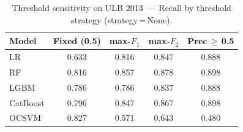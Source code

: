 \begin{table}[ht]
\centering
\caption{Threshold sensitivity on ULB 2013~--- Recall by threshold strategy (strategy\,=\,None).}
\label{tab:threshold_ulb_recall}
\begin{tabular}{l c c c c}
\toprule
Model & Fixed (0.5) & max-$F_1$ & max-$F_2$ & Prec\,$\geq$\,0.5 \\
\midrule
LR         & 0.633 & 0.816 & 0.847 & 0.888 \\
RF         & 0.816 & 0.857 & 0.878 & 0.898 \\
LGBM       & 0.786 & 0.786 & 0.837 & 0.888 \\
CatBoost   & 0.796 & 0.847 & 0.867 & 0.898 \\
OCSVM      & 0.827 & 0.571 & 0.643 & 0.480 \\
\bottomrule
\end{tabular}
\end{table}